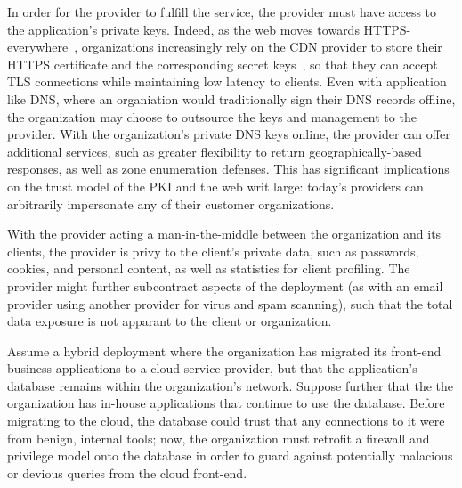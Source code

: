 
%
In order for the provider to fulfill the service, the provider must
have access to the application's private keys.
%
Indeed, as the web moves towards HTTPS-everywhere~\cite{felt-2017-https},
organizations increasingly rely on the CDN provider to store their HTTPS
certificate and the corresponding secret keys~\cite{key-sharing,
when-https-meets-cdn}, so that they can accept TLS connections while
maintaining low latency to clients.
%
Even with application like DNS, where an organiation would traditionally sign
their DNS records offline, the organization may choose to outsource the keys
and management to the provider.
%
With the organization's private DNS keys online, the provider can offer
additional services, such as greater flexibility to return geographically-based
responses, as well as zone enumeration defenses.
%
This has significant implications on the trust model of the PKI and the web
writ large: today's providers can arbitrarily impersonate any of their customer
organizations.


%
With the provider acting a man-in-the-middle between the
organization and its clients, the provider is privy to the client's private
data, such as passwords, cookies, and personal content, as well as statistics
for client profiling.
%
The provider might further subcontract aspects of the deployment (as with an
email provider using another provider for virus and spam scanning), such that
the total data exposure is not apparant to the client or organization.


%
Assume a hybrid deployment where the organization has migrated its front-end
business applications to a cloud service provider, but that the application's
database remains within the organization’s network. 
%
Suppose further that the the organization has in-house applications that
continue to use the database. 
%
Before migrating to the cloud, the database could trust that any connections to
it were from benign, internal tools; now, the organization must retrofit a
firewall and privilege model onto the database in order to guard against
potentially malacious or devious queries from the cloud front-end.


